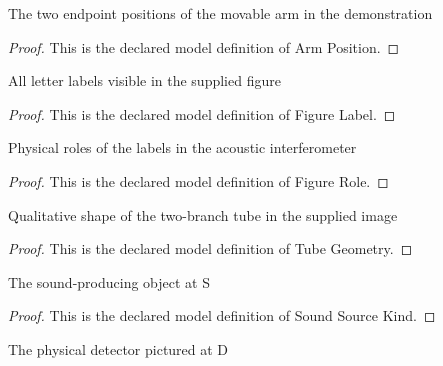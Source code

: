 \begin{definition}
  \label{def:physics:phyx-mini-0325:phyxminiproblems-problemphyxmini0325-armposition}
  The two endpoint positions of the movable arm in the demonstration
\end{definition}
\begin{proof}
  This is the declared model definition of Arm Position.
\end{proof}
\begin{definition}
  \label{def:physics:phyx-mini-0325:phyxminiproblems-problemphyxmini0325-figurelabel}
  All letter labels visible in the supplied figure
\end{definition}
\begin{proof}
  This is the declared model definition of Figure Label.
\end{proof}
\begin{definition}
  \label{def:physics:phyx-mini-0325:phyxminiproblems-problemphyxmini0325-figurerole}
  Physical roles of the labels in the acoustic interferometer
\end{definition}
\begin{proof}
  This is the declared model definition of Figure Role.
\end{proof}
\begin{definition}
  \label{def:physics:phyx-mini-0325:phyxminiproblems-problemphyxmini0325-tubegeometry}
  Qualitative shape of the two-branch tube in the supplied image
\end{definition}
\begin{proof}
  This is the declared model definition of Tube Geometry.
\end{proof}
\begin{definition}
  \label{def:physics:phyx-mini-0325:phyxminiproblems-problemphyxmini0325-soundsourcekind}
  The sound-producing object at S
\end{definition}
\begin{proof}
  This is the declared model definition of Sound Source Kind.
\end{proof}
\begin{definition}
  \label{def:physics:phyx-mini-0325:phyxminiproblems-problemphyxmini0325-sounddetectorkind}
  The physical detector pictured at D
\end{definition}
